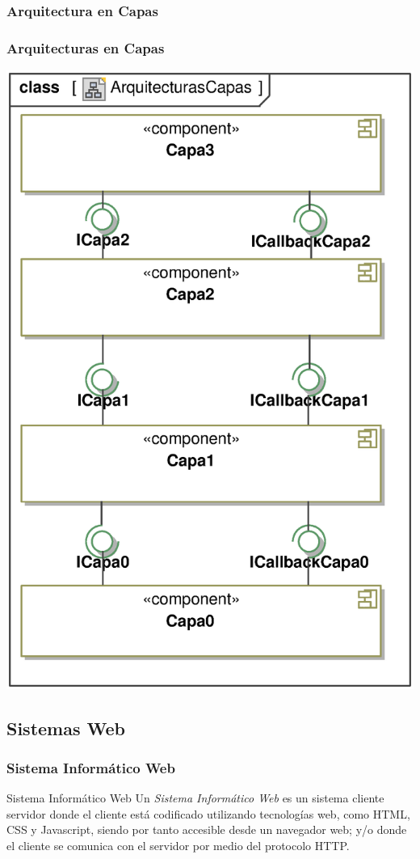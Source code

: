 \documentclass[a4paper,slidestop,xcolor=pst,dvips,blue]{beamer}
\begin{document}
\subsubsection{Arquitectura en Capas}

\begin{frame}[c]
	\frametitle{Arquitecturas en Capas}
	\begin{center}
        \includegraphics[width=.40\linewidth,keepaspectratio=true]{images/patterns/layered00.eps}
	\end{center}
\end{frame}

\subsection{Sistemas Web}

\begin{frame}[c]
    \frametitle{Sistema Informático Web}
    \begin{block}{Sistema Informático Web}
        Un \emph{Sistema Informático Web} es un sistema cliente servidor donde el cliente está codificado utilizando tecnologías web, como HTML, CSS y Javascript, siendo por tanto accesible desde un navegador web; y/o donde el cliente se comunica con el servidor por medio del protocolo HTTP.
    \end{block}
\end{frame}
\end{document}
